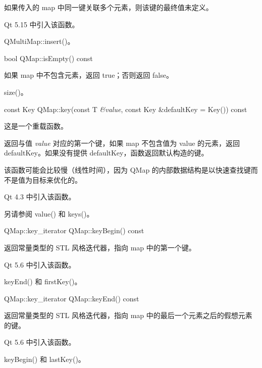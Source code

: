 \begin{notice}[另请参阅]
如果传入的 map 中同一键关联多个元素，则该键的最终值未定义。
\end{notice}

Qt 5.15 中引入该函数。

\begin{notice}[另请参阅]
QMultiMap::insert()。
\end{notice}

\splitLine

bool QMap::isEmpty() const

如果 map 中不包含元素，返回 true；否则返回 false。

\begin{notice}
size()。
\end{notice}

\splitLine

const Key QMap::key(const T \emph{\&value}, const Key \&defaultKey = Key()) const

这是一个重载函数。

返回与值 \emph{value} 对应的第一个键，如果 map 不包含值为 value 的元素，返回 defaultKey。如果没有提供 defaultKey，函数返回默认构造的键。

该函数可能会比较慢（线性时间），因为 QMap 的内部数据结构是以快速查找键而不是值为目标来优化的。

Qt 4.3 中引入该函数。

\begin{notice}[另请参阅]
另请参阅 value() 和 keys()。
\end{notice}

\splitLine

QMap::key\_iterator QMap::keyBegin() const

返回常量类型的 STL 风格迭代器，指向 map 中的第一个键。

Qt 5.6 中引入该函数。

\begin{notice}[另请参阅]
keyEnd() 和 firstKey()。
\end{notice}

\splitLine

QMap::key\_iterator QMap::keyEnd() const

返回常量类型的 STL 风格迭代器，指向 map 中的最后一个元素之后的假想元素的键。

Qt 5.6 中引入该函数。

\begin{notice}[另请参阅]
keyBegin() 和 lastKey()。
\end{notice}

